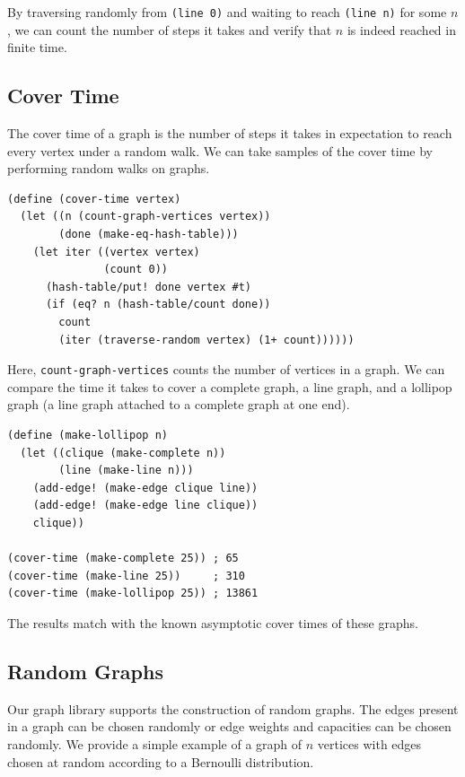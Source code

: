 \documentclass[11pt]{article} %
\theoremstyle{component}
\begin{document}
\noindent By traversing randomly from \verb|(line 0)| and waiting to reach \verb|(line n)| for some $n$, we can count the number of steps it takes and verify that $n$ is indeed reached in finite time.

\subsection{Cover Time}

The cover time of a graph is the number of steps it takes in expectation to reach every vertex under a random walk.  We can take samples of the cover time by performing random walks on graphs.

\begin{verbatim}
(define (cover-time vertex)
  (let ((n (count-graph-vertices vertex))
        (done (make-eq-hash-table)))
    (let iter ((vertex vertex)
               (count 0))
      (hash-table/put! done vertex #t)
      (if (eq? n (hash-table/count done))
        count
        (iter (traverse-random vertex) (1+ count))))))
\end{verbatim}

\noindent Here, \verb|count-graph-vertices| counts the number of vertices in a graph.  We can compare the time it takes to cover a complete graph, a line graph, and a lollipop graph (a line graph attached to a complete graph at one end).

\begin{verbatim}
(define (make-lollipop n)
  (let ((clique (make-complete n))
        (line (make-line n)))
    (add-edge! (make-edge clique line))
    (add-edge! (make-edge line clique))
    clique))

(cover-time (make-complete 25)) ; 65
(cover-time (make-line 25))     ; 310
(cover-time (make-lollipop 25)) ; 13861
\end{verbatim}

\noindent The results match with the known asymptotic cover times of these graphs.

\subsection{Random Graphs}

Our graph library supports the construction of random graphs.  The edges present in a graph can be chosen randomly or edge weights and capacities can be chosen randomly.  We provide a simple example of a graph of $n$ vertices with edges chosen at random according to a Bernoulli distribution.
\end{document}
